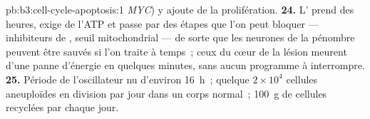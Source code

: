 \begin{solution}{pb:b3:cell-cycle-apoptosis:1}
\emph{MYC}) y ajoute de la prolifération.
\textbf{24.} L' prend des heures, exige de l'ATP et passe par
des étapes que l'on peut bloquer --- inhibiteurs de , seuil
mitochondrial --- de sorte que les neurones de la pénombre peuvent être
sauvés si l'on traite à temps~; ceux du cœur de la lésion meurent d'une
panne d'énergie en quelques minutes, sans aucun programme à
interrompre.
\textbf{25.} Période de l'oscillateur nu d'environ \qty{16}{h}~; quelque $2\times
10^{4}$ cellules aneuploïdes en division par jour dans un corps
normal~; \qty{100}{g} de cellules recyclées par  chaque jour.
\end{solution}
